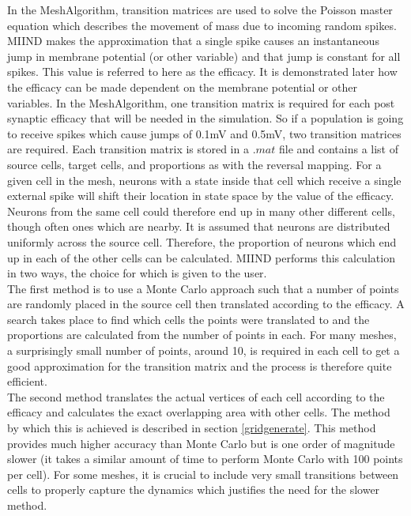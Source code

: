 \documentclass[utf8]{frontiersSCNS} %
\begin{document}
In the MeshAlgorithm, transition matrices are used to solve the Poisson master equation which describes the movement of mass due to incoming random spikes. MIIND makes the approximation that a single spike causes an instantaneous jump in membrane potential (or other variable) and that jump is constant for all spikes. This value is referred to here as the efficacy. It is demonstrated later how the efficacy can be made dependent on the membrane potential or other variables. In the MeshAlgorithm, one transition matrix is required for each post synaptic efficacy that will be needed in the simulation. So if a population is going to receive spikes which cause jumps of 0.1mV and 0.5mV, two transition matrices are required. Each transition matrix is stored in a $.mat$ file and contains a list of source cells, target cells, and proportions as with the reversal mapping. For a given cell in the mesh, neurons with a state inside that cell which receive a single external spike will shift their location in state space by the value of the efficacy. Neurons from the same cell could therefore end up in many other different cells, though often ones which are nearby. It is assumed that neurons are distributed uniformly across the source cell. Therefore, the proportion of neurons which end up in each of the other cells can be calculated. MIIND performs this calculation in two ways, the choice for which is given to the user.\\
The first method is to use a Monte Carlo approach such that a number of points are randomly placed in the source cell then translated according to the efficacy. A search takes place to find which cells the points were translated to and the proportions are calculated from the number of points in each. For many meshes, a surprisingly small number of points, around 10, is required in each cell to get a good approximation for the transition matrix and the process is therefore quite efficient.\\
The second method translates the actual vertices of each cell according to the efficacy and calculates the exact overlapping area with other cells. The method by which this is achieved is described in section \ref{gridgenerate}. This method provides much higher accuracy than Monte Carlo but is one order of magnitude slower (it takes a similar amount of time to perform Monte Carlo with 100 points per cell). For some meshes, it is crucial to include very small transitions between cells to properly capture the dynamics which justifies the need for the slower method.\\
\end{document}
